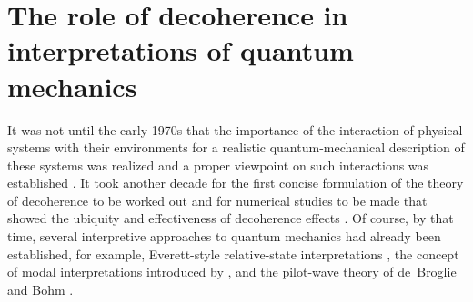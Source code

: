 \documentclass[twocolumn,rmp,aps,amsmath,amsfonts,noshowkeys,noshowpacs]{revtex4}
\begin{document}
\section{\label{sec:interpret}The role of decoherence in
  interpretations of quantum mechanics}

It was not until the early 1970s that the importance of the
interaction of physical systems with their environments for a
realistic quantum-mechanical description of these systems was realized
and a proper viewpoint on such interactions was established
\citep{Zeh:1970:yt,Zeh:1973:wq}. It took another decade for the first
concise formulation of the theory of decoherence
\citep{Zurek:1981:dd,Zurek:1982:tv} to be worked out and for numerical
studies to be made that showed the ubiquity and effectiveness of
decoherence effects \citep{Joos:1985:iu}. Of course, by that time,
several interpretive approaches to quantum mechanics had already been
established, for example, Everett-style relative-state interpretations
\citep{Everett:1957:rw}, the concept of modal interpretations
introduced by \citet{Fraassen:1973:yb,Fraassen:1991:ys}, and the
pilot-wave theory of de~Broglie and Bohm \citep{Bohm:1952:rc}.
\end{document}
